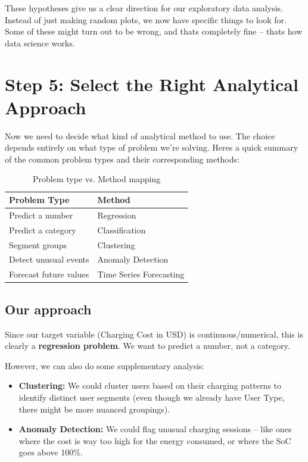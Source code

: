 \documentclass[12pt, a4paper]{article}
\begin{document}
These hypotheses give us a clear direction for our exploratory data analysis. Instead of just making random plots, we now have specific things to look for. Some of these might turn out to be wrong, and thats completely fine -- thats how data science works.

\newpage

\section{Step 5: Select the Right Analytical Approach}

Now we need to decide what kind of analytical method to use. The choice depends entirely on what type of problem we're solving. Heres a quick summary of the common problem types and their corresponding methods:

\begin{table}[H]
\centering
\caption{Problem type vs. Method mapping}
\begin{tabular}{p{5cm} p{6cm}}
\toprule
\textbf{Problem Type} & \textbf{Method} \\
\midrule
Predict a number & Regression \\
Predict a category & Classification \\
Segment groups & Clustering \\
Detect unusual events & Anomaly Detection \\
Forecast future values & Time Series Forecasting \\
\bottomrule
\end{tabular}
\end{table}

\subsection{Our approach}

Since our target variable (Charging Cost in USD) is continuous/numerical, this is clearly a \textbf{regression problem}. We want to predict a number, not a category.

However, we can also do some supplementary analysis:
\begin{itemize}
    \item \textbf{Clustering:} We could cluster users based on their charging patterns to identify distinct user segments (even though we already have User Type, there might be more nuanced groupings).
    \item \textbf{Anomaly Detection:} We could flag unusual charging sessions -- like ones where the cost is way too high for the energy consumed, or where the SoC goes above 100\%.
\end{itemize}
\end{document}
